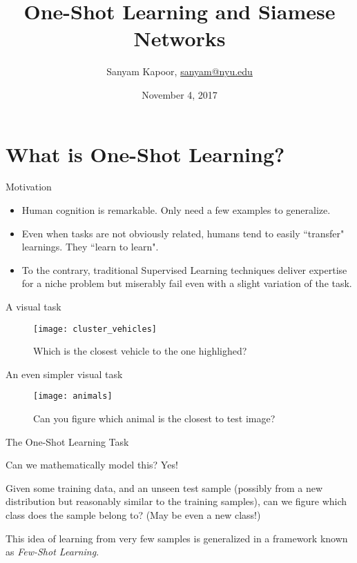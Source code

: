 \documentclass{beamer}
\title{One-Shot Learning and Siamese Networks}
\author{Sanyam Kapoor, \href{mailto:sanyam@nyu.edu}{sanyam@nyu.edu}}
\date{November 4, 2017}
\institute{Courant Institute, NYU}
\begin{document}
\maketitle

\section{What is One-Shot Learning?}

\begin{frame}{Motivation}

\begin{itemize}
\item Human cognition is remarkable. Only need a few examples to generalize.

\item Even when tasks are not obviously related, humans tend to 
easily ``transfer" learnings. They ``learn to learn".

\item To the contrary, traditional Supervised Learning techniques deliver expertise for
a niche problem but miserably fail even with a slight variation of the task.
\end{itemize}

\end{frame}

\begin{frame}{A visual task}

\begin{figure}[H]
\caption{Which is the closest vehicle to the one highlighed? \cite{Lake_oneshot}}
\texttt{[image: cluster\_vehicles]}
\centering
\label{img:cluster_vehicles}
\end{figure}

\end{frame}

\begin{frame}{An even simpler visual task}

\begin{figure}[H]
\caption{Can you figure which animal is the closest to test image? \cite{Koch2015SiameseNN}}
\texttt{[image: animals]}
\centering
\label{img:animals}
\end{figure}

\end{frame}

\begin{frame}{The One-Shot Learning Task}

Can we mathematically model this? Yes!

Given some training data, and an unseen test sample (possibly from a new
distribution but reasonably similar to the training samples), can we figure which
class does the sample belong to? (May be even a new class!)

This idea of learning from very few samples is generalized in a framework
known as \textit{Few-Shot Learning}.

\end{frame}
\end{document}
